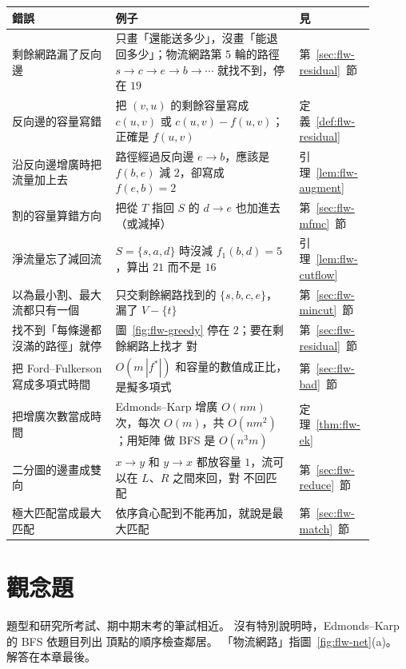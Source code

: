 \begin{center}
\small
\begin{tabular}{>{\raggedright\arraybackslash}p{0.27\linewidth}>{\raggedright\arraybackslash}p{0.48\linewidth}>{\raggedright\arraybackslash}p{0.15\linewidth}}
\toprule
錯誤 & 例子 & 見 \\
\midrule
剩餘網路漏了反向邊 & 只畫「還能送多少」，沒畫「能退回多少」；物流網路第 5 輪的路徑
$s \to c \to e \to b \to \cdots$ 就找不到，停在 $19$ & 第~\ref{sec:flw-residual}~節 \\
反向邊的容量寫錯 & 把 $(v, u)$ 的剩餘容量寫成 $c(u, v)$ 或 $c(u, v) - f(u, v)$；正確是
$f(u, v)$ & 定義~\ref{def:flw-residual} \\
沿反向邊增廣時把流量加上去 & 路徑經過反向邊 $e \to b$，應該是 $f(b, e)$ 減 $2$，卻寫成
$f(e, b) = 2$ & 引理~\ref{lem:flw-augment} \\
割的容量算錯方向 & 把從 $T$ 指回 $S$ 的 $d \to e$ 也加進去（或減掉） &
第~\ref{sec:flw-mfmc}~節 \\
淨流量忘了減回流 & $S = \{s, a, d\}$ 時沒減 $f_1(b, d) = 5$，算出 $21$ 而不是 $16$ &
引理~\ref{lem:flw-cutflow} \\
以為最小割、最大流都只有一個 & 只交剩餘網路找到的 $\{s, b, c, e\}$，漏了 $V - \{t\}$ &
第~\ref{sec:flw-mincut}~節 \\
找不到「每條邊都沒滿的路徑」就停 & 圖~\ref{fig:flw-greedy} 停在 $2$；要在剩餘網路上找才
對 & 第~\ref{sec:flw-residual}~節 \\
把 Ford--Fulkerson 寫成多項式時間 & $O(m\,|f^{*}|)$ 和容量的數值成正比，是擬多項式 &
第~\ref{sec:flw-bad}~節 \\
把增廣次數當成時間 & Edmonds--Karp 增廣 $O(nm)$ 次，每次 $O(m)$，共 $O(nm^2)$；用矩陣
做 BFS 是 $O(n^3 m)$ & 定理~\ref{thm:flw-ek} \\
二分圖的邊畫成雙向 & $x \to y$ 和 $y \to x$ 都放容量 $1$，流可以在 $L$、$R$ 之間來回，對
不回匹配 & 第~\ref{sec:flw-reduce}~節 \\
極大匹配當成最大匹配 & 依序貪心配到不能再加，就說是最大匹配 & 第~\ref{sec:flw-match}~節 \\
\bottomrule
\end{tabular}
\end{center}

\section{觀念題}
\label{sec:flw-exercises}

題型和研究所考試、期中期末考的筆試相近。 沒有特別說明時，Edmonds--Karp 的 BFS 依題目列出
頂點的順序檢查鄰居。 「物流網路」指圖~\ref{fig:flw-net}(a)。 解答在本章最後。

